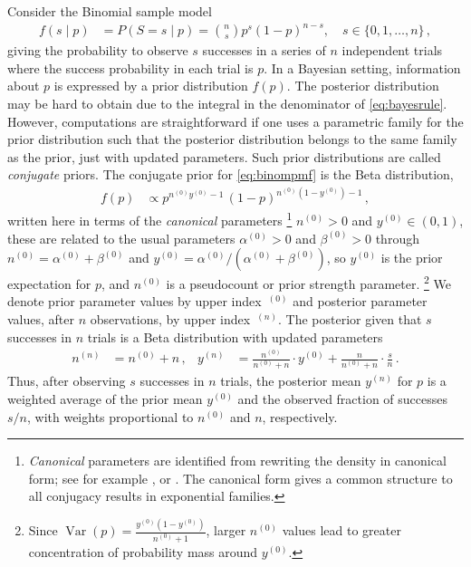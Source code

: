 \documentclass[runningheads,a4paper]{llncs}
\newcommand{\uz}{^{(0)}} %
\newcommand{\un}{^{(n)}} %
\def\yz{y\uz}
\def\yn{y\un}
\def\nz{n\uz}
\def\nn{n\un}
\newcommand{\az}{\alpha\uz}
\newcommand{\bz}{\beta\uz}
\newcommand{\V}{\operatorname{Var}}
\newcommand{\bin}{\operatorname{Binom}} %
\begin{document}
Consider the Binomial sample model
\begin{align}
f(s\mid p) &= P(S = s \mid p) = {n \choose s} p^s (1-p)^{n-s},\quad s \in \{0, 1, \ldots, n\}\,,
\label{eq:binompmf}
\end{align}
giving the probability to observe $s$ successes in a series of $n$ independent trials
where the success probability in each trial is $p$.
%
In a Bayesian setting, information about $p$ is expressed by a prior distribution $f(p)$.
The posterior distribution may be hard to obtain due to the integral in the denominator of \eqref{eq:bayesrule}.
%
However, computations are straightforward if one uses a parametric family for the prior distribution such that
the posterior distribution belongs to the same family as the prior, just with updated parameters.
Such prior distributions are called \emph{conjugate} priors.
The conjugate prior for \eqref{eq:binompmf} is the Beta distribution,
\begin{align}
f(p) &\propto p^{\nz\yz-1}\, (1-p)^{\nz(1-\yz)-1}\,,
\label{eq:betadensny}
\end{align}
written here in terms of the \emph{canonical} parameters%
\footnote{\emph{Canonical} parameters are identified from rewriting the density in canonical form;
see for example \cite[pp.~202 and 272f]{2000:bernardosmith}, or \cite[\S 1.2.3.1]{2013:diss-gw}.
The canonical form gives a common structure to all conjugacy results in exponential families.}
$\nz > 0$ and $\yz \in (0,1)$,
these are related to the usual parameters $\az > 0$ and $\bz > 0$ through
$\nz = \az + \bz$ and $\yz = \az / (\az+\bz)$,
so $\yz$ is the prior expectation for $p$,
and $\nz$ is a pseudocount or prior strength parameter.%
\footnote{Since $\V(p) = \frac{\yz (1-\yz)}{\nz + 1}$,
larger $\nz$ values lead to greater concentration of probability mass around $\yz$.}
We denote prior parameter values by upper index~${}\uz$ and posterior parameter values, after $n$ observations,
by upper index~${}\un$.
The posterior given that $s$ successes in $n$ trials is a Beta distribution with updated parameters
\begin{align}
\nn &= \nz + n\,, &
\yn &= \frac{\nz}{\nz + n} \cdot \yz + \frac{n}{\nz + n} \cdot \frac{s}{n}\,.
\label{eq:nyupdate}
\end{align}
Thus, after observing $s$ successes in $n$ trials,
the posterior mean $\yn$ for $p$ is a weighted average of
the prior mean $\yz$ and the observed fraction of successes $s/n$,
with weights proportional to $\nz$ and $n$, respectively.
\end{document}
